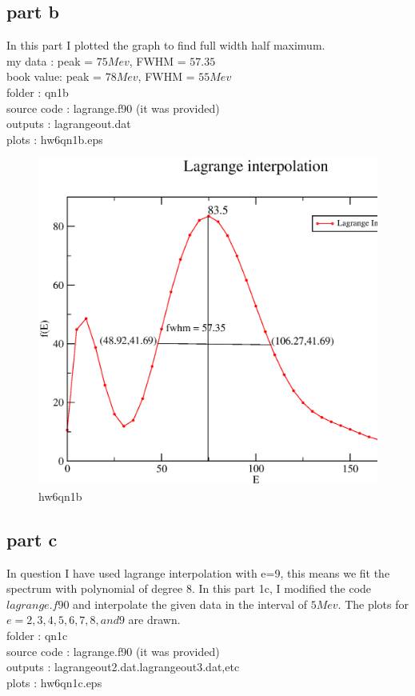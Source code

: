 \documentclass[11pt,a4paper,english]{article}
\begin{document}
	
	
	\subsection{part b}
In this part I plotted the graph to find full width half maximum.\\
my data   : peak = $75Mev$, FWHM = $57.35$\\
book value: peak = $78Mev$, FWHM = $55Mev$ \\ 
    folder       : qn1b\\
	source code  : lagrange.f90 (it was provided)\\
	outputs      : lagrangeout.dat\\
	plots        : hw6qn1b.eps\\
	
	\begin{figure}[h!]
	\centering
	\includegraphics [scale=0.6]{hw6qn1b.eps}
	\caption{hw6qn1b }
	\end{figure}
	\clearpage
	
	\subsection{part c}
In question I have used lagrange interpolation with e=9, this means we fit the spectrum with polynomial of degree 8. In this part 1c, I modified the code $lagrange.f90$ and  interpolate the given data in the interval of $5Mev$. The plots for $e=2,3,4,5,6,7,8,and 9$ are drawn.\\
    folder       : qn1c\\
	source code  : lagrange.f90 (it was provided)\\
	outputs      : lagrangeout2.dat.lagrangeout3.dat,etc\\
	plots        : hw6qn1c.eps\\
	
\end{document}
